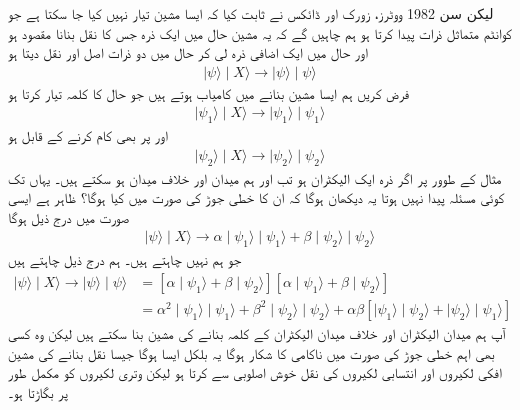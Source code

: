 لیکن سن \num{1982} ووٹرز، زورک اور ڈائکس نے ثابت کیا کہ ایسا مشین تیار نہیں کیا جا سکتا ہے جو کوانٹم متماثل ذرات پیدا کرتا ہو ہم چاہیں گے کہ یہ مشین حال  میں ایک ذرہ جس کا نقل بنانا مقصود ہو اور حال  میں ایک اضافی ذرہ لی کر  حال  میں دو ذرات  اصل اور نقل دیتا ہو 
\begin{align}
	\mid\psi\rangle\mid X\rangle\to\mid\psi\rangle\mid\psi\rangle
\end{align}
فرض کریں ہم ایسا مشین بنانے میں کامیاب ہوتے ہیں جو حال  کا کلمہ تیار کرتا ہو 
\begin{align}
	\mid\psi_1\rangle\mid X\rangle\to\mid\psi_1\rangle\mid\psi_1\rangle
\end{align}
اور  پر بھی کام کرنے کے قابل ہو
\begin{align}
	\mid\psi_2\rangle\mid X\rangle\to\mid\psi_2\rangle\mid\psi_2\rangle
\end{align}
مثال کے طوور پر اگر ذرہ ایک الیکٹران ہو تب  اور  ہم میدان اور خلاف میدان ہو سکتے ہیں۔ یہاں تک کوئی مسئلہ پیدا نہیں ہوتا یہ دیکھان ہوگا کہ ان کا خطی جوڑ  کی صورت میں کیا ہوگا؟ ظاہر ہے ایسی صورت میں درج ذیل ہوگا
\begin{align}
	\mid\psi\rangle\mid X\rangle\to\alpha\mid\psi_1\rangle\mid\psi_1\rangle+\beta\mid\psi_2\rangle\mid\psi_2\rangle
\end{align}
جو ہم نہیں چاہتے ہیں۔ ہم درج ذیل چاہتے ہیں  
\begin{align}
	\mid\psi\rangle\mid X\rangle\to\mid\psi\rangle\mid\psi\rangle &= [\alpha\mid\psi_1\rangle+\beta\mid\psi_2\rangle][\alpha\mid\psi_1\rangle+\beta\mid\psi_2\rangle]\nonumber \\
	&= \alpha^2\mid\psi_1\rangle\mid\psi_1\rangle+\beta^2\mid\psi_2\rangle\mid\psi_2\rangle+\alpha\beta[\mid\psi_1\rangle\mid\psi_2\rangle+\mid\psi_2\rangle\mid\psi_1\rangle]
\end{align}
آپ ہم میدان الیکٹران اور خلاف میدان الیکٹران کے کلمہ بنانے کی مشین بنا سکتے ہیں لیکن وہ کسی بھی اہم خطی جوڑ کی صورت میں ناکامی کا شکار ہوگا یہ بلکل ایسا ہوگا جیسا نقل بنانے کی مشین  افکی لکیروں اور انتسابی لکیروں کی نقل خوش اصلوبی سے کرتا ہو لیکن وتری لکیروں کو مکمل طور پر بگاڑتا ہو۔

